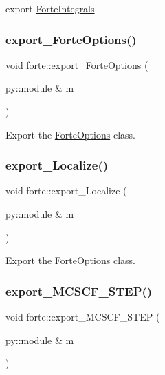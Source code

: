 export \mbox{\hyperlink{classforte_1_1_forte_integrals}{Forte\+Integrals}} 

\mbox{\label{namespaceforte_af56187354afd4d129b9b1adc651fd11d}} 
\subsubsection{\texorpdfstring{export\+\_\+\+Forte\+Options()}{export\_ForteOptions()}}
{\footnotesize\ttfamily void forte\+::export\+\_\+\+Forte\+Options (\begin{DoxyParamCaption}\item[{py\+::module \&}]{m }\end{DoxyParamCaption})}



Export the \mbox{\hyperlink{classforte_1_1_forte_options}{Forte\+Options}} class. 

\mbox{\label{namespaceforte_a8c692535b03b849c36dfbfd0272b6c3d}} 
\subsubsection{\texorpdfstring{export\+\_\+\+Localize()}{export\_Localize()}}
{\footnotesize\ttfamily void forte\+::export\+\_\+\+Localize (\begin{DoxyParamCaption}\item[{py\+::module \&}]{m }\end{DoxyParamCaption})}



Export the \mbox{\hyperlink{classforte_1_1_forte_options}{Forte\+Options}} class. 

\mbox{\label{namespaceforte_ac1a18c60d7df44fe17c14234b9df670d}} 
\subsubsection{\texorpdfstring{export\+\_\+\+M\+C\+S\+C\+F\+\_\+S\+T\+E\+P()}{export\_MCSCF\_2STEP()}}
{\footnotesize\ttfamily void forte\+::export\+\_\+\+M\+C\+S\+C\+F\+\_\+S\+T\+EP (\begin{DoxyParamCaption}\item[{py\+::module \&}]{m }\end{DoxyParamCaption})}

